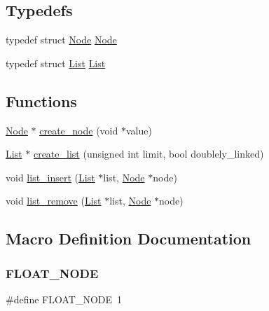 \subsection*{Typedefs}
\begin{DoxyCompactItemize}
\item 
typedef struct \hyperlink{structNode}{Node} \hyperlink{linked-list_8h_a3b09f37e675bcd48a01bf22155996872}{Node}
\item 
typedef struct \hyperlink{structList}{List} \hyperlink{linked-list_8h_ab2926f8a4255847074664d6549d3a1ee}{List}
\end{DoxyCompactItemize}
\subsection*{Functions}
\begin{DoxyCompactItemize}
\item 
\hyperlink{structNode}{Node} $\ast$ \hyperlink{linked-list_8h_a45dfa9366701eddf667fd95d05cc3be0}{create\+\_\+node} (void $\ast$value)
\item 
\hyperlink{structList}{List} $\ast$ \hyperlink{linked-list_8h_abd16529dbe0922996788f10925823eea}{create\+\_\+list} (unsigned int limit, bool doublely\+\_\+linked)
\item 
void \hyperlink{linked-list_8h_a947069a28d8173531d9186a74e82fb62}{list\+\_\+insert} (\hyperlink{structList}{List} $\ast$list, \hyperlink{structNode}{Node} $\ast$node)
\item 
void \hyperlink{linked-list_8h_ad17dd6e2d3e64d3e9665f313ffb808a1}{list\+\_\+remove} (\hyperlink{structList}{List} $\ast$list, \hyperlink{structNode}{Node} $\ast$node)
\end{DoxyCompactItemize}


\subsection{Macro Definition Documentation}
\mbox{\label{linked-list_8h_ac7657356b9d25f27a814e9e5d7ae3d72}} 
\subsubsection{\texorpdfstring{F\+L\+O\+A\+T\+\_\+\+N\+O\+DE}{FLOAT\_NODE}}
{\footnotesize\ttfamily \#define F\+L\+O\+A\+T\+\_\+\+N\+O\+DE~1}

